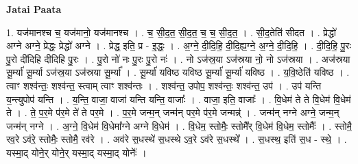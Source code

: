 \documentclass[17pt]{extarticle}
\begin{document}
\textbf{Jatai Paata} \newline

1. यज॑मानश्च च॒ यज॑मानो॒ यज॑मानश्च । . च॒ सी॒द॒त॒ सी॒द॒त॒ च॒ च॒ सी॒द॒त॒ । . सी॒द॒तेति॑ सीदत । . प्रेद्धो॑ अग्ने अग्ने॒ प्रेद्धः॒ प्रेद्धो॑ अग्ने । . प्रेद्ध॒ इति॒ प्र - इ॒द्धः॒ । . अ॒ग्ने॒ दी॒दि॒हि॒ दी॒दि॒ह्य॒ग्ने॒ अ॒ग्ने॒ दी॒दि॒हि॒ । . दी॒दि॒हि॒ पु॒रः पु॒रो दी॑दिहि दीदिहि पु॒रः । . पु॒रो नो॑ नः पु॒रः पु॒रो नः॑ । . नो ऽज॑स्र॒या ऽज॑स्रया नो॒ नो ऽज॑स्रया । . अज॑स्रया सू॒र्म्या॑ सू॒र्म्या ऽज॑स्र॒या ऽज॑स्रया सू॒र्म्या᳚ । . सू॒र्म्या॑ यविष्ठ यविष्ठ सू॒र्म्या॑ सू॒र्म्या॑ यविष्ठ । . य॒वि॒ष्ठेति॑ यविष्ठ । . त्वाꣳ शश्व॑न्तः॒ शश्व॑न्त॒ स्त्वाम् त्वाꣳ शश्व॑न्तः । . शश्व॑न्त॒ उपोप॒ शश्व॑न्तः॒ शश्व॑न्त॒ उप॑ । . उप॑ यन्ति य॒न्त्युपोप॑ यन्ति । . य॒न्ति॒ वाजा॒ वाजा॑ यन्ति यन्ति॒ वाजाः᳚ । . वाजा॒ इति॒ वाजाः᳚ । . वि॒धेम॑ ते ते वि॒धेम॑ वि॒धेम॑ ते । . ते॒ प॒र॒मे प॑र॒मे ते॑ ते पर॒मे । . प॒र॒मे जन्म॒न् जन्म॑न् पर॒मे प॑र॒मे जन्मन्न्॑ । . जन्म॑न् नग्ने अग्ने॒ जन्म॒न् जन्म॑न् नग्ने । . अ॒ग्ने॒ वि॒धेम॑ वि॒धेमा᳚ग्ने अग्ने वि॒धेम॑ । . वि॒धेम॒ स्तोमैः॒ स्तोमै᳚र् वि॒धेम॑ वि॒धेम॒ स्तोमैः᳚ । . स्तोमै॒ रव॒रे ऽव॑रे॒ स्तोमैः॒ स्तोमै॒ रव॑रे । . अव॑रे स॒धस्थे॑ स॒धस्थे ऽव॒रे ऽव॑रे स॒धस्थे᳚ । . स॒धस्थ॒ इति॑ स॒ध - स्थे॒ । . यस्मा॒द् योने॒र् योने॒र् यस्मा॒द् यस्मा॒द् योनेः᳚ । \newline
\end{document}
